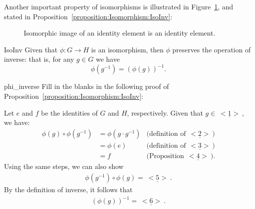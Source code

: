 Another important property of isomorphisms is illustrated in Figure~\ref{fig:Isomorphism:isomInv}, and stated in Proposition~\ref{proposition:Isomorphism:IsoInv}:

\begin{figure}[htb]
	  \caption{\label{fig:Isomorphism:isomInv} Isomorphic image of an  identity element is an identity element. }
\end{figure}

\begin{prop}{IsoInv}
Given that  $\phi : G \rightarrow H$ is an  isomorphism, then $\phi$ preserves the operation of inverse: that is, for any $g \in G$ we have
\begin{equation*}
\phi(g^{-1}) = (\phi(g))^{-1}.
\end{equation*}
\end{prop}

\begin{exercise}{phi_inverse}
Fill in the blanks in the following proof of Proposition~\ref{proposition:Isomorphism:IsoInv}:
\medskip

\noindent
Let $e$ and $f$ be the identities of $G$ and $H$, respectively. Given that $g \in \underline{~<1>~}$, we have:
\begin{align*}
\phi(g) \circ \phi(g^{-1}) &= \phi(g \cdot g^{-1}) & \textrm{(definition of}~\underline{~<2>~})\\
&= \phi(e) &\textrm{(definition of}~\underline{~<3>~})\\
&= f &\textrm{(Proposition}~\underline{~<4>~} ).
\end{align*}
Using the same steps, we can also show
\begin{align*}
\phi(g^{-1}) \circ \phi(g) = \underline{~<5>~}.
\end{align*}
By the definition of inverse, it follows that
\begin{align*}
( \phi(g))^{-1} = \underline{~<6>~}.
\end{align*}
\end{exercise} 

